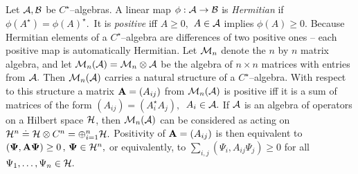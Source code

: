 \documentclass[12pt]{article}
\begin{document}
Let ${\cal A, B}$ be $C^{\star}$--algebras.  A linear map $\phi :  {\cal A}
\rightarrow {\cal B}$ is {\em Hermitian} if $\phi  (A^{\star}) = \phi
 (A)^{\star }. $\ It is {\em positive} iff $A\geq 0 , $ $A\in {\cal A}$ implies $
\phi  (A)\geq 0 . $ Because Hermitian elements of a $C^{\star}$--algebra are
differences of two positive ones -- each positive map is automatically
Hermitian.  Let ${\cal M}_n$ denote the $n$ by $n$ matrix algebra,  and let $
{\cal M}_n ({\cal A}) = {\cal M}_n \otimes {\cal A}$ be the 
algebra of $n\times n$ matrices with entries from ${\cal A}. $ Then 
$
{\cal M}_n ({\cal A})$ carries a natural structure of a $C^{\star}$--algebra.  
With respect to this structure a  matrix ${\bf 
A}= (A_{ij})$ from ${\cal M}_n  ({\cal A})$ is positive iff it is  a sum of
matrices of the form $ (A_{ij}) =  (A_i^{\star } A_j ), \,  $ $A_i\in {\cal A} . $ 
If ${\cal 
A}$ is an algebra of operators on a Hilbert space ${\cal H}$,  then ${\cal M}
_n ({\cal A})$ can be considered as acting on ${\cal H}^n \doteq {\cal H}
\otimes C^n = \oplus_{i=1}^n {\cal H} . $ Positivity of ${\bf A}= (A_{ij})$ is
then equivalent to $ ({\bf \Psi}, {\bf A} {\bf \Psi} )\geq 0\,  ,  \,  {\bf \Psi}
\in {\cal H}^n ,  $ or equivalently,  to $\sum_{i, j}  (\Psi_i ,  A_{ij} \Psi_j
) \geq 0 $ for all $\Psi_1, \ldots , \Psi_n \in {\cal H} . $
\end{document}
